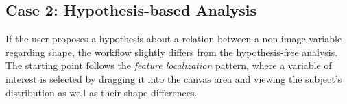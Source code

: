 \documentclass[journal]{style/vgtc} 			          %
\newcommand{\com}[1]{\textcolor{orange}{\uline{#1}}}
\begin{document}
\subsection{Case 2: Hypothesis-based Analysis}
If the user proposes a hypothesis about a relation between a non-image variable regarding shape, the workflow slightly differs from the hypothesis-free analysis.
%
The starting point follows the \emph{feature localization} pattern, where a variable of interest is selected by dragging it into the canvas area and viewing the subject's distribution as well as their shape differences.
% 
\end{document}
